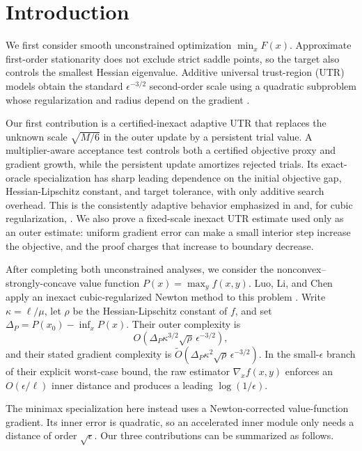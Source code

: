\documentclass{article}
\begin{document}
\section{Introduction}

We first consider smooth unconstrained optimization
$\min_x F(x)$.  Approximate first-order stationarity does not exclude
strict saddle points, so the target also controls the smallest Hessian
eigenvalue.  Additive universal trust-region (UTR) models obtain the
standard $\epsilon^{-3/2}$ second-order scale using a quadratic
subproblem whose regularization and radius depend on the gradient
\citep{jiang2026utr}.

Our first contribution is a certified-inexact adaptive UTR that
replaces the unknown scale $\sqrt{M/6}$ in the outer update by a
persistent trial value.
A multiplier-aware acceptance test controls both a certified objective
proxy and gradient growth, while the persistent update amortizes
rejected trials.  Its exact-oracle specialization has sharp leading
dependence on the initial objective gap, Hessian-Lipschitz constant,
and target tolerance, with only additive search overhead.
This is the consistently adaptive behavior emphasized in
\citet{hamad2022consistently} and, for cubic regularization,
\citet{fang2026parameter}.  We also prove a fixed-scale inexact UTR
estimate used only as an outer estimate: uniform
gradient error can make a small interior step increase the objective,
and the proof charges that increase to boundary decrease.

After completing both unconstrained analyses, we consider the
nonconvex--strongly-concave value function
$P(x)=\max_y f(x,y)$.  Luo, Li, and Chen apply an inexact
cubic-regularized Newton method to this problem
\citep{luo2022finding}.  Write $\kappa=\ell/\mu$, let $\rho$ be the
Hessian-Lipschitz constant of $f$, and set
$\Delta_P=P(x_0)-\inf_xP(x)$.  Their outer complexity is
\[
 O\!\left(
  \Delta_P\kappa^{3/2}\sqrt\rho\,\epsilon^{-3/2}
 \right),
\]
and their stated gradient complexity is
$\widetilde O(\Delta_P\kappa^2\sqrt\rho\,\epsilon^{-3/2})$.
In the small-$\epsilon$ branch of their explicit worst-case bound, the
raw estimator $\nabla_x f(x,y)$ enforces an $O(\epsilon/\ell)$ inner
distance and produces a leading $\log(1/\epsilon)$.

The minimax specialization here instead uses a Newton-corrected
value-function gradient.  Its inner error is quadratic, so an
accelerated inner module only needs a distance of order
$\sqrt\epsilon$.  Our three contributions can be summarized as
follows.
\end{document}
